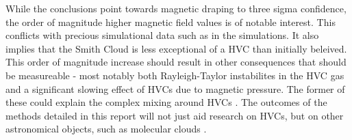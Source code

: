 While the conclusions point towards magnetic draping to three sigma confidence, the order of magnitude higher magnetic field values is of notable interest. This conflicts with precious simulational data such as in the \citeauthor{ID23} simulations. It also implies that the Smith Cloud is less exceptional of a HVC than initially beleived. This order of magnitude increase should result in other consequences that should be measureable - most notably both Rayleigh-Taylor instabilites in the HVC gas and a significant slowing effect of HVCs due to magnetic pressure. The former of these could explain the complex mixing around HVCs \citep{ID67}. The outcomes of the methods detailed in this report will not just aid research on HVCs, but on other astronomical objects, such as molecular clouds \citep{ID70}.